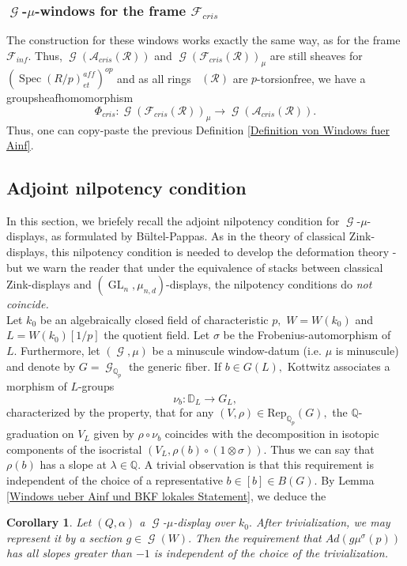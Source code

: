 \documentclass[a4paper,10,5 pt]{amsart}
\newtheorem{Corollary}[Satz]{Corollary}
\theoremstyle{definition}
\DeclareMathOperator{\Spec}{Spec}
\DeclareMathOperator{\GL}{GL}
\DeclareMathOperator{\Acris}{\mathbb{A}_{cris}}
\DeclareMathOperator{\G}{\mathcal{G}}
\begin{document}
\subsubsection{$\G$-$\mu$-windows for the frame $\mathcal{F}_{cris}$} The construction for these windows works exactly the same way, as for the frame $\mathcal{F}_{inf}.$ Thus, $\G(\mathcal{A}_{cris}(\mathcal{R}))$ and $\G(\mathcal{F}_{cris}(\mathcal{R}))_{\mu}$ are still sheaves for $(\Spec(R/p)^{aff}_{et})^{op}$ and as all rings $\Acris(\mathcal{R})$ are $p$-torsionfree, we have a groupsheafhomomorphism
$$
\Phi_{cris}\colon \G(\mathcal{F}_{cris}(\mathcal{R}))_{\mu} \rightarrow \G(\mathcal{A}_{cris}(\mathcal{R})).
$$
Thus, one can copy-paste the previous Definition \ref{Definition von Windows fuer Ainf}.
\subsection{Adjoint nilpotency condition}
In this section, we briefely recall the adjoint nilpotency condition for $\G$-$\mu$-displays, as formulated by Bültel-Pappas. As in the theory of classical Zink-displays, this nilpotency condition is needed to develop the deformation theory - but we warn the reader that under the equivalence of stacks between classical Zink-displays and $(\GL_{n},\mu_{n,d})$-displays, the nilpotency conditions  do \textit{not coincide.}
\\
Let $k_{0}$ be an algebraically closed field of characteristic $p,$ $W=W(k_{0})$ and $L=W(k_{0})[1/p]$ the quotient field. Let $\sigma$ be the Frobenius-automorphism of $L.$ Furthermore, let $(\G,\mu)$ be a minuscule window-datum (i.e. $\mu$ is minuscule) and denote by $G=\G_{\mathbb{Q}_{p}}$ the generic fiber. If $b\in G(L),$ Kottwitz associates a morphism of $L$-groups
$$
\nu_{b}\colon \mathbb{D}_{L}\rightarrow G_{L},
$$
characterized by the property, that for any $(V,\rho)\in \text{Rep}_{\mathbb{Q}_{p}}(G),$ the $\mathbb{Q}$-graduation on $V_{L}$ given by $\rho\circ \nu_{b}$ coincides with the decomposition in isotopic components of the isocristal $(V_{L},\rho(b)\circ (1\otimes \sigma)).$ Thus we can say that $\rho(b)$ has a slope at $\lambda\in \mathbb{Q}.$ A trivial observation is that this requirement is independent of the choice of a representative $b\in [b]\in B(G).$ 
By Lemma \ref{Windows ueber Ainf und BKF lokales Statement}, we deduce the
\begin{Corollary}
Let $(Q,\alpha)$ a $\G$-$\mu$-display over $k_{0}.$ After trivialization, we may represent it by a section $g\in \G(W).$ Then the requirement that $Ad(g\mu^{\sigma}(p))$ has all slopes greater than $-1$ is independent of the choice of the trivialization.
\end{Corollary}
\end{document}
